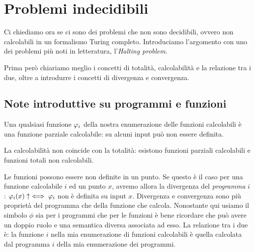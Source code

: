 %
%
%
%
\chapter{Problemi indecidibili}

Ci chiediamo ora se ci sono dei problemi che non sono decidibili, ovvero non calcolabili in un
formalismo Turing completo. Introduciamo l'argomento con uno dei problemi più noti in letteratura,
l'\textit{Halting problem}.

Prima però chiariamo meglio i concetti di totalità, calcolabilità e la relazione tra i due, oltre
a introdurre i concetti di divergenza e convergenza.

\section{Note introduttive su programmi e funzioni}

Una qualsiasi funzione $\varphi_{i}$ della nostra enumerazione delle funzioni calcolabili è una funzione
parziale calcolabile: su alcuni input può non essere definita. 

La calcolabilità non coincide con la totalità: esistono funzioni parziali calcolabili e funzioni
totali non calcolabili.

Le funzioni possono essere non definite in un punto. Se questo è il caso per una funzione
calcolabile $i$ ed un punto $x$, avremo allora la divergenza del \emph{programma} $i$: $\varphi_{i}(x)
\uparrow \iff \varphi_{i}$ non è definita su input $x$. Divergenza e convergenza sono più proprietà del
programma che della funzione che calcola. Nonostante qui usiamo il simbolo $\phi$ sia per i
programmi che per le funzioni è bene ricordare che può avere un doppio ruolo e una semantica
diversa associata ad esso. La relazione tra i due è: la funzione $i$ nella mia enumerazione di
funzioni calcolabili è quella calcolata dal programma $i$ della mia enumerazione dei programmi.

